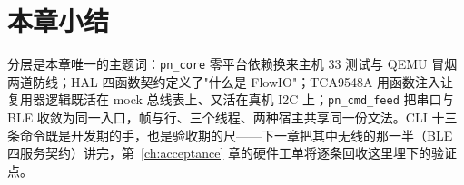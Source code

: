 \section*{本章小结}
分层是本章唯一的主题词：\texttt{pn\_core} 零平台依赖换来主机 33 测试与 QEMU 冒烟两道防线；HAL 四函数契约定义了"什么是 FlowIO"；TCA9548A 用函数注入让复用器逻辑既活在 mock 总线表上、又活在真机 I2C 上；\texttt{pn\_cmd\_feed} 把串口与 BLE 收敛为同一入口，帧与行、三个线程、两种宿主共享同一份文法。CLI 十三条命令既是开发期的手，也是验收期的尺——下一章把其中无线的那一半（BLE 四服务契约）讲完，第~\ref{ch:acceptance} 章的硬件工单将逐条回收这里埋下的验证点。
